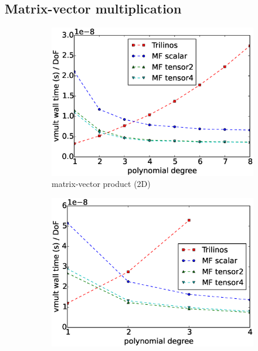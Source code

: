 \documentclass[times,doublespace]{nmeauth}
\begin{document}
\subsection{Matrix-vector multiplication}

\begin{figure}[!ht]
  \centering
  \begin{subfigure}[b]{0.49\textwidth}
      \centering
      \includegraphics[width=\textwidth]{Emmy_RRZE_timing2d.eps}
      \caption{matrix-vector product (2D)}
      \label{fig:benchmark_miehe_Emmy_vmult2}
  \end{subfigure}
  \begin{subfigure}[b]{0.49\textwidth}
    \centering
    \includegraphics[width=\textwidth]{Emmy_RRZE_timing3d.eps}

\end{subfigure}
\end{figure}
\end{document}

